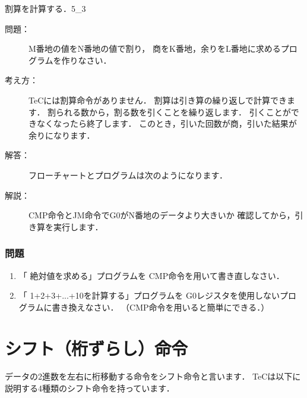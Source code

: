 \newpage
\begin{reidai}{割算を計算する．}{5_3}
  \begin{description}
  \item[問題：]
    M番地の値をN番地の値で割り，
    商をK番地，余りをL番地に求めるプログラムを作りなさい．

  \item[考え方：]
    TeCには割算命令がありません．
    割算は引き算の繰り返しで計算できます．
    割られる数から，割る数を引くことを繰り返します．
    引くことができなくなったら終了します．
    このとき，引いた回数が商，引いた結果が余りになります．

  \item[解答：]
    フローチャートとプログラムは次のようになります．\\

    \begin{center}
    \end{center}

  \item[解説：]CMP命令とJM命令でG0がN番地のデータより大きいか
    確認してから，引き算を実行します．

  \end{description}
\end{reidai}

\vfill
\subsubsection{問題}
\begin{enumerate}
\item 「 絶対値を求める」プログラムを
  CMP命令を用いて書き直しなさい．

\item 「 1+2+3+...+10を計算する」プログラムを
  G0レジスタを使用しないプログラムに書き換えなさい．
  （CMP命令を用いると簡単にできる．）
\end{enumerate}
\vfill

\newpage
\section{シフト（桁ずらし）命令}
データの2進数を左右に桁移動する命令をシフト命令と言います．
TeCは以下に説明する4種類のシフト命令を持っています．

